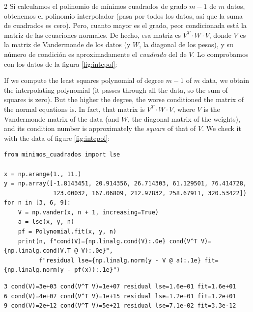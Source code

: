 \begin{paracol}{2}
Si calculamos el polinomio de mínimos cuadrados de grado $m-1$ de $m$ datos, obtenemos el polinomio interpolador (pasa por todos los datos, así que la suma de cuadrados es cero). Pero, cuanto mayor es el grado, peor condicionada está la matriz de las ecuaciones normales. De hecho, esa matriz es $V^T\cdot W\cdot V$, donde $V$ es la matriz de Vandermonde de los datos (y $W$, la diagonal de los pesos), y su número de condición es aproximadamente el \emph{cuadrado} del de $V$. Lo comprobamos con los datos de la figura \ref{fig:intepol}:

\switchcolumn
If we compute the least squares polynomial of degree $m-1$ of $m$ data, we obtain the interpolating polynomial (it passes through all the data, so the sum of squares is zero). But the higher the degree, the worse conditioned the matrix of the normal equations is. In fact, that matrix is $V^T\cdot W\cdot V$, where $V$ is the Vandermonde matrix of the data (and $W$, the diagonal matrix of the weights), and its condition number is approximately the \emph{square} of that of $V$. We check it with the data of figure \ref{fig:intepol}:
\end{paracol}

\begin{verbatim}
from minimos_cuadrados import lse

x = np.arange(1., 11.)
y = np.array([-1.8143451, 20.914356, 26.714303, 61.129501, 76.414728,
              123.00032, 167.06809, 212.97832, 258.67911, 320.53422])
for n in [3, 6, 9]:
    V = np.vander(x, n + 1, increasing=True)
    a = lse(x, y, n)
    pf = Polynomial.fit(x, y, n)
    print(n, f"cond(V)={np.linalg.cond(V):.0e} cond(V^T V)={np.linalg.cond(V.T @ V):.0e}",
          f"residual lse={np.linalg.norm(y - V @ a):.1e} fit={np.linalg.norm(y - pf(x)):.1e}")
\end{verbatim}
\begin{verbatim}
3 cond(V)=3e+03 cond(V^T V)=1e+07 residual lse=1.6e+01 fit=1.6e+01
6 cond(V)=4e+07 cond(V^T V)=1e+15 residual lse=1.2e+01 fit=1.2e+01
9 cond(V)=2e+12 cond(V^T V)=5e+21 residual lse=7.1e-02 fit=3.3e-12
\end{verbatim}

